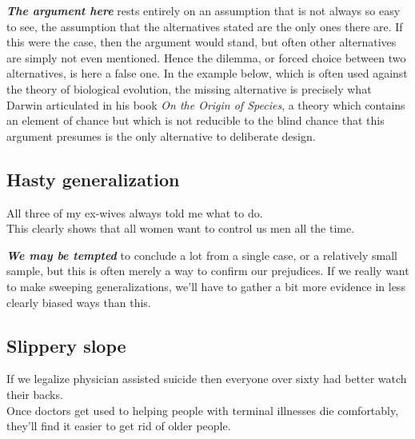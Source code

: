 \documentclass[
  12pt, openany]{book}
\theoremstyle{definition}
\theoremstyle{definition}
\theoremstyle{definition}
\theoremstyle{definition}
\theoremstyle{remark}
\begin{document}
\textbf{\emph{The argument here}} rests entirely on an assumption that is not always so easy to see, the assumption that the alternatives stated are the only ones there are. If this were the case, then the argument would stand, but often other alternatives are simply not even mentioned. Hence the dilemma, or forced choice between two alternatives, is here a false one. In the example below, which is often used against the theory of biological evolution, the missing alternative is precisely what Darwin articulated in his book \emph{On the Origin of Species}, a theory which contains an element of chance but which is not reducible to the blind chance that this argument presumes is the only alternative to deliberate design.

\hypertarget{hasty-generalization}{%
\subsection*{Hasty generalization}\label{hasty-generalization}}


\begin{center}

\begin{argument}
All three of my ex-wives always told me what to do.\\

This clearly shows that all women want to control us men all the time.

\end{argument}


\end{center}

\textbf{\emph{We may be tempted}} to conclude a lot from a single case, or a relatively small sample, but this is often merely a way to confirm our prejudices. If we really want to make sweeping generalizations, we'll have to gather a bit more evidence in less clearly biased ways than this.

\hypertarget{slippery-slope}{%
\subsection*{Slippery slope}\label{slippery-slope}}


\begin{center}

\begin{argument}
If we legalize physician assisted suicide then everyone over sixty had better watch their backs.\\

Once doctors get used to helping people with terminal illnesses die comfortably, they'll find it easier to get rid of older people.

\end{argument}


\end{center}
\end{document}
